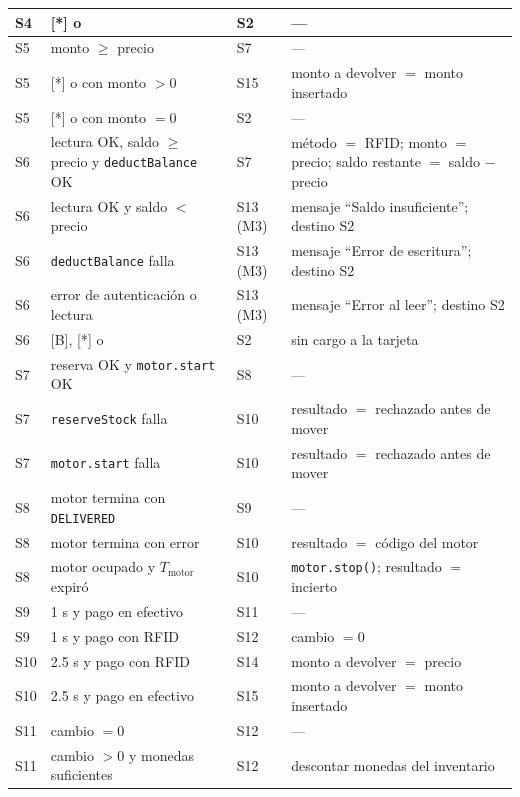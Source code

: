 \documentclass[12pt,a4paper]{article}
\begin{document}
{\begin{longtable}{@{}p{1.0cm}p{5.5cm}p{1.9cm}p{5.5cm}@{}}
S4  & {[*]} o \tin{}                              & S2  & ---\\ \hline
S5  & monto $\ge$ precio                          & S7  & ---\\
S5  & {[*]} o \tin{} con monto $>0$               & S15 & monto a devolver $=$ monto insertado\\
S5  & {[*]} o \tin{} con monto $=0$               & S2  & ---\\ \hline
S6  & lectura OK, saldo $\ge$ precio y \texttt{deductBalance} OK & S7 & m\'etodo $=$ RFID; monto $=$ precio; saldo restante $=$ saldo $-$ precio\\
S6  & lectura OK y saldo $<$ precio               & S13 (M3) & mensaje ``Saldo insuficiente''; destino S2\\
S6  & \texttt{deductBalance} falla                & S13 (M3) & mensaje ``Error de escritura''; destino S2\\
S6  & error de autenticaci\'on o lectura          & S13 (M3) & mensaje ``Error al leer''; destino S2\\
S6  & {[B]}, {[*]} o \tin{}                       & S2  & sin cargo a la tarjeta\\ \hline
S7  & reserva OK y \texttt{motor.start} OK        & S8  & ---\\
S7  & \texttt{reserveStock} falla                 & S10 & resultado $=$ rechazado antes de mover\\
S7  & \texttt{motor.start} falla                  & S10 & resultado $=$ rechazado antes de mover\\ \hline
S8  & motor termina con \texttt{DELIVERED}        & S9  & ---\\
S8  & motor termina con error                     & S10 & resultado $=$ c\'odigo del motor\\
S8  & motor ocupado y $T_{\mathrm{motor}}$ expir\'o & S10 & \texttt{motor.stop()}; resultado $=$ incierto\\ \hline
S9  & 1 s y pago en efectivo                      & S11 & ---\\
S9  & 1 s y pago con RFID                         & S12 & cambio $=0$\\ \hline
S10 & 2.5 s y pago con RFID                       & S14 & monto a devolver $=$ precio\\
S10 & 2.5 s y pago en efectivo                    & S15 & monto a devolver $=$ monto insertado\\ \hline
S11 & cambio $=0$                                 & S12 & ---\\
S11 & cambio $>0$ y monedas suficientes           & S12 & descontar monedas del inventario\\

\end{longtable}}
\end{document}
